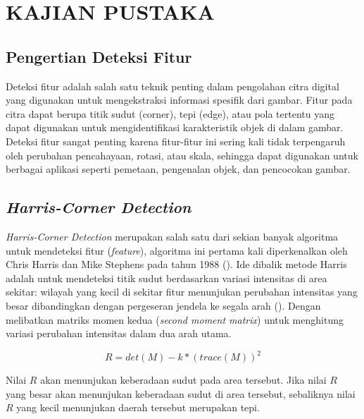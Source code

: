 
\chapter{KAJIAN PUSTAKA}

\section{Pengertian Deteksi Fitur}
  Deteksi fitur adalah salah satu teknik penting dalam pengolahan citra digital yang digunakan untuk mengekstraksi informasi spesifik dari gambar. 
Fitur pada citra dapat berupa titik sudut (corner), tepi (edge), atau pola tertentu yang dapat digunakan untuk mengidentifikasi karakteristik objek di dalam gambar. 
Deteksi fitur sangat penting karena fitur-fitur ini sering kali tidak terpengaruh oleh perubahan pencahayaan, rotasi, atau skala, sehingga dapat digunakan untuk berbagai aplikasi seperti pemetaan, pengenalan objek, dan pencocokan gambar.

\section{\emph{Harris-Corner Detection}}
  \emph{Harris-Corner Detection} merupakan salah satu dari sekian banyak algoritma untuk mendeteksi fitur (\emph{feature}), algoritma ini pertama kali diperkenalkan oleh Chris Harris dan Mike Stephens pada tahun 1988 (\cite{Harris2013}). 
Ide dibalik metode Harris adalah untuk mendeteksi titik sudut berdasarkan variasi intensitas di area sekitar: wilayah yang kecil di sekitar fitur menunjukan perubahan intensitas yang besar dibandingkan dengan pergeseran jendela ke segala arah (\cite{Sanchez2018}).
Dengan melibatkan matriks momen kedua (\emph{second moment matrix}) untuk menghitung variasi perubahan intensitas dalam dua arah utama.

\begin{equation}
  R = det(M) - k * (trace(M))^2
  \label{Harris-Corner Detection}
\end{equation}

  Nilai \(R\) akan menunjukan keberadaan sudut pada area tersebut. 
Jika nilai \(R\) yang besar akan menunjukan keberadaan sudut di area tersebut, sebaliknya nilai \(R\) yang kecil menunjukan daerah tersebut merupakan tepi.

